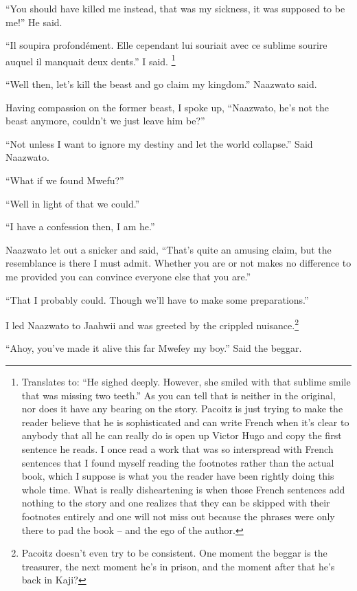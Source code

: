 ``You should have killed me instead, that was my sickness, it was supposed to be me!'' He said.

``Il soupira profond{\'e}ment. Elle cependant lui souriait avec ce sublime sourire auquel il manquait deux dents.'' I said. \footnote{Translates to: ``He sighed deeply. However, she smiled with that sublime smile that was missing two teeth.'' As you can tell that is neither in the original, nor does it have any bearing on the story. Pa\-co\-itz is just trying to make the reader believe that he is sophisticated and can write French when it's clear to anybody that all he can really do is open up Victor Hugo and copy the first sentence he reads. I once read a work that was so interspread with French sentences that I found myself reading the footnotes rather than the actual book, which I suppose is what you the reader have been rightly doing this whole time. What is really disheartening is when those French sentences add nothing to the story and one realizes that they can be skipped with their footnotes entirely and one will not miss out because the phrases were only there to pad the book -- and the ego of the author.}

``Well then, let's kill the beast and go claim my kingdom.'' Naa\-zwa\-to said.

Having compassion on the former beast, I spoke up, ``Naa\-zwa\-to, he's not the beast anymore, couldn't we just leave him be?''

``Not unless I want to ignore my destiny and let the world collapse.'' Said Naa\-zwa\-to.

``What if we found Mwe\-fu?''

``Well in light of that we could.''

``I have a confession then, I am he.''

Naa\-zwa\-to let out a snicker and said, ``That's quite an amusing claim, but the resemblance is there I must admit. Whether you are or not makes no difference to me provided you can convince everyone else that you are.''

``That I probably could. Though we'll have to make some preparations.''

I led Naa\-zwa\-to to Jaahwii and was greeted by the crippled nuisance.\footnote{Pa\-co\-itz doesn't even try to be consistent. One moment the beggar is the treasurer, the next moment he's in prison, and the moment after that he's back in Ka\-ji?}

``Ahoy, you've made it alive this far Mwefey my boy.'' Said the beggar.


